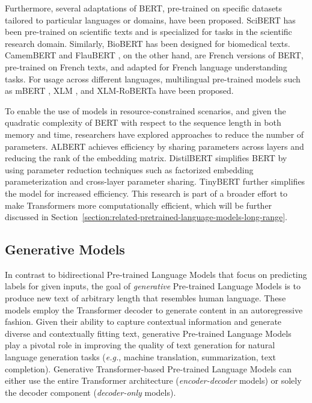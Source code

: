 Furthermore, several adaptations of \ac{BERT}, pre-trained on specific datasets tailored to particular languages or domains, have been proposed. SciBERT \citep{beltagy2019scibert} has been pre-trained on scientific texts and is specialized for tasks in the scientific research domain. Similarly, BioBERT \citep{lee2020biobert} has been designed for biomedical texts. CamemBERT \citep{martin2019camembert} and FlauBERT \citep{le2019flaubert}, on the other hand, are French versions of \ac{BERT}, pre-trained on French texts, and adapted for French language understanding tasks. For usage across different languages, multilingual pre-trained models such as mBERT \citep{devlin2018bert}, XLM \citep{lample2019cross}, and XLM-RoBERTa \citep{conneau2019unsupervised} have been proposed. 

To enable the use of models in resource-constrained scenarios, and given the quadratic complexity of \ac{BERT} with respect to the sequence length in both memory and time, researchers have explored approaches to reduce the number of parameters. \ac{ALBERT} achieves efficiency by sharing parameters across layers and reducing the rank of the embedding matrix. DistilBERT \citep{sanh2019distilbert} simplifies \ac{BERT} by using parameter reduction techniques such as factorized embedding parameterization and cross-layer parameter sharing. TinyBERT \citep{jiao2019tinybert} further simplifies the model for increased efficiency. This research is part of a broader effort to make Transformers more computationally efficient, which will be further discussed in Section~\ref{section:related-pretrained-language-models-long-range}.

\subsection{Generative Models} 

In contrast to bidirectional Pre-trained Language Models that focus on predicting labels for given inputs, the goal of \textit{generative} Pre-trained Language Models is to produce new text of arbitrary length that resembles human language. These models employ the Transformer decoder to generate content in an autoregressive fashion. Given their ability to capture contextual information and generate diverse and contextually fitting text, generative Pre-trained Language Models play a pivotal role in improving the quality of text generation for natural language generation tasks (\textit{e.g.}, machine translation, summarization, text completion). Generative Transformer-based Pre-trained Language Models can either use the entire Transformer architecture (\textit{encoder-decoder} models) or solely the decoder component (\textit{decoder-only} models).

